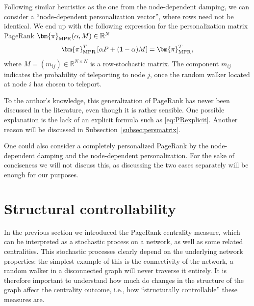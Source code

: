 \documentclass[sn-mathphys-ay]{sn-jnl}%
\newcommand{\R}{\mathbb{R}}
\theoremstyle{thmstyleone}%
\theoremstyle{thmstyletwo}%
\theoremstyle{thmstylethree}%
\begin{document}
Following similar heuristics as the one from the node-dependent damping, we can consider a ``node-dependent personalization vector'', where rows need not be identical. We end up with the following expression for the personalization matrix PageRank $\bm{\pi}_{\rm MPR}(\alpha,M)\in \R^{N}$
\begin{equation}\label{eq:PMPageRank}
	\bm{\pi}_{\rm MPR}^T \left[\alpha P + (1-\alpha)  M\right] = \bm{\pi}_{\rm MPR}^T,
\end{equation}
where $M=(m_{ij})\in\R^{N\times N}$ is a row-stochastic matrix. The component $m_{ij}$ indicates the probability of teleporting to node $j$, once the random walker located at node $i$ has chosen to teleport. 

To the author's knowledge, this generalization of PageRank has never been discussed in the literature, even though it is rather sensible. One possible explanation is the lack of an explicit formula such as \eqref{eq:PRexplicit}. Another reason will be discussed in Subsection~\ref{subsec:persmatrix}.

One could also consider a completely personalized PageRank by the node-dependent damping and the node-dependent personalization. For the sake of conciseness we will not discuss this, as discussing the two cases separately will be enough for our purposes.





\section{Structural controllability}\label{sec:structcontrol}

In the previous section we introduced the PageRank centrality measure, which can be interpreted as a stochastic process on a network, as well as some related centralities. This stochastic processes clearly depend on the underlying network properties: the simplest example of this is the connectivity of the network, a random walker in a disconnected graph will never traverse it entirely. It is therefore important to understand how much do changes in the structure of the graph affect the centrality outcome, i.e., how ``structurally controllable'' these measures are.

\end{document}

